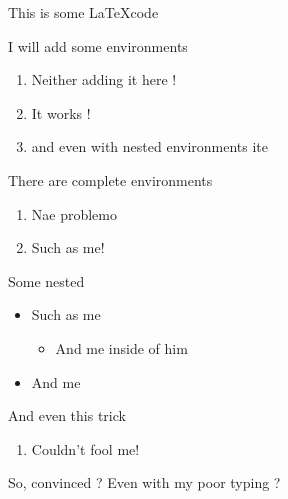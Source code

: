 \documentclass{article}
\begin{document}
    This is some \LaTeX code

    I will add some environments

    \begin{enumerate}
        \item Neither adding it here !
        \item It works !
        \item and even with nested environments ite
    \end{enumerate}

    There are complete environments
    \begin{enumerate}
        \item Nae problemo
        \item Such as me!
    \end{enumerate}

    Some nested
    \begin{itemize}
        \item Such as me
        \begin{itemize}
            \item And me inside of him
        \end{itemize}
        \item And me
    \end{itemize}


    And even this trick
    \begin{enumerate}
        \item Couldn't fool me!
    \end{enumerate}

    So, convinced ? Even with my poor typing ?
\end{document}
